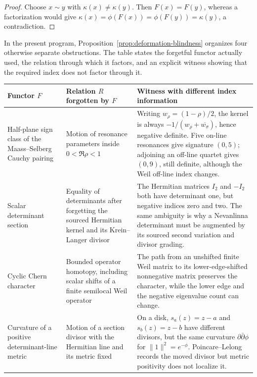 \documentclass[11pt]{amsart}
\theoremstyle{definition}
\theoremstyle{remark}
\begin{document}
\begin{proof}
Choose \(x\sim y\) with \(\kappa(x)\ne\kappa(y)\).  Then
\(F(x)=F(y)\), whereas a factorization would give
\(\kappa(x)=\phi(F(x))=\phi(F(y))=\kappa(y)\), a contradiction.
\end{proof}

In the present program, Proposition~\ref{prop:deformation-blindness}
organizes four otherwise separate obstructions.  The table states the
forgetful functor actually used, the relation through which it factors,
and an explicit witness showing that the required index does not factor
through it.

\begin{center}
\small
\renewcommand{\arraystretch}{1.25}
\begin{tabular}{>{\raggedright\arraybackslash}p{}
                >{\raggedright\arraybackslash}p{}
                >{\raggedright\arraybackslash}p{}}
\toprule
Functor \(F\) & Relation \(R\) forgotten by \(F\) & Witness with different
index information\\
\midrule
Half-plane sign class of the Maass--Selberg Cauchy pairing
& Motion of resonance parameters inside \(0<\Re\rho<1\)
& Writing \(w_\rho=(1-\rho)/2\), the kernel is always
\(-1/(w_\rho+\overline{w_\sigma})\), hence negative definite.  Five
on-line resonances give signature \((0,5)\); adjoining an off-line quartet
gives \((0,9)\), still definite, although the Weil off-line index changes.\\
Scalar determinant section
& Equality of determinants after forgetting the sourced Hermitian kernel
and its Krein--Langer divisor
& The Hermitian matrices \(I_2\) and \(-I_2\) both have determinant one,
but negative indices zero and two.  The same ambiguity is why a
Nevanlinna determinant must be augmented by its sourced second variation
and divisor grading.\\
Cyclic Chern character
& Bounded operator homotopy, including scalar shifts of a finite
semilocal Weil operator
& The path from an unshifted finite Weil matrix to its lower-edge-shifted
nonnegative matrix preserves the character, while the lower edge and the
negative eigenvalue count can change.\\
Curvature of a positive determinant-line metric
& Motion of a section divisor with the Hermitian line and its metric fixed
& On a disk, \(s_a(z)=z-a\) and \(s_b(z)=z-b\) have different divisors,
but the same curvature \(\partial\bar\partial\phi\) for
\(\|1\|^2=e^{-\phi}\).  Poincare--Lelong records the moved divisor but
metric positivity does not localize it.\\
\bottomrule
\end{tabular}
\end{center}
\end{document}
